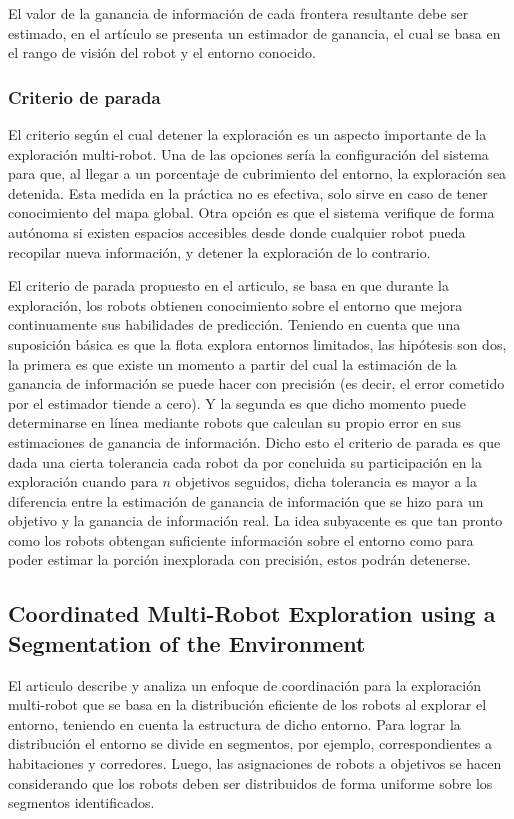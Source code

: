 El valor de la ganancia de información de cada frontera resultante debe ser estimado, en el artículo se presenta un estimador de ganancia, el cual se basa en el rango de visión del robot y el entorno conocido. 

\subsubsection{Criterio de parada}

El criterio según el cual detener la exploración es un aspecto importante de la exploración multi-robot. Una de las opciones sería la configuración del sistema para que, al llegar a un porcentaje de cubrimiento del entorno, la exploración sea detenida. Esta medida en la práctica no es efectiva, solo sirve en caso de tener conocimiento del mapa global. Otra opción es que el sistema verifique de forma autónoma si existen espacios accesibles desde donde cualquier robot pueda recopilar nueva información, y detener la exploración de lo contrario.

El criterio de parada propuesto en el articulo, se basa en que durante la exploración, los robots obtienen conocimiento sobre el entorno que mejora continuamente sus habilidades de predicción. Teniendo en cuenta que una suposición básica es que la flota explora entornos limitados, las hipótesis son dos, la primera es que existe un momento a partir del cual la estimación de la ganancia de información se puede hacer con precisión (es decir, el error cometido por el estimador tiende a cero). Y la segunda es que dicho momento puede determinarse en línea mediante robots que calculan su propio error en sus estimaciones de ganancia de información. Dicho esto el criterio de parada es que dada una cierta tolerancia cada robot da por concluida su participación en la exploración cuando para $n$ objetivos seguidos, dicha tolerancia es mayor a la diferencia entre la estimación de ganancia de información que se hizo para un objetivo y la ganancia de información real. La idea subyacente es que tan pronto como los robots obtengan suficiente información sobre el entorno como para poder estimar la porción inexplorada con precisión, estos podrán detenerse.

\subsection{Coordinated Multi-Robot Exploration using a Segmentation of the Environment}\cite{wurm2008coordinated}
El articulo describe y analiza un enfoque de coordinación para la exploración multi-robot que se basa en la distribución eficiente de los robots al explorar el entorno, teniendo en cuenta la estructura de dicho entorno. Para lograr la distribución el entorno se divide en segmentos, por ejemplo, correspondientes a habitaciones y corredores. Luego, las asignaciones de robots a objetivos se hacen considerando que los robots deben ser distribuidos de forma uniforme sobre los segmentos identificados. 

